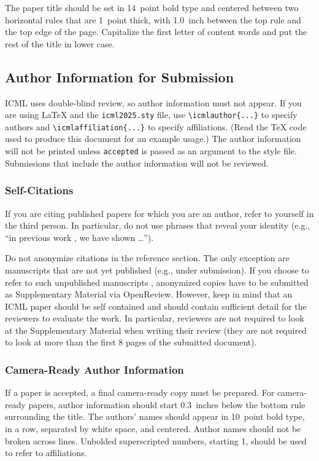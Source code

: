 \documentclass{article}
\theoremstyle{plain}
\theoremstyle{definition}
\theoremstyle{remark}
\begin{document}
The paper title should be set in 14~point bold type and centered
between two horizontal rules that are 1~point thick, with 1.0~inch
between the top rule and the top edge of the page. Capitalize the
first letter of content words and put the rest of the title in lower
case.

\subsection{Author Information for Submission}
\label{author info}

ICML uses double-blind review, so author information must not appear. If
you are using \LaTeX\/ and the \texttt{icml2025.sty} file, use
\verb+\icmlauthor{...}+ to specify authors and \verb+\icmlaffiliation{...}+ to specify affiliations. (Read the TeX code used to produce this document for an example usage.) The author information
will not be printed unless \texttt{accepted} is passed as an argument to the
style file.
Submissions that include the author information will not
be reviewed.

\subsubsection{Self-Citations}

If you are citing published papers for which you are an author, refer
to yourself in the third person. In particular, do not use phrases
that reveal your identity (e.g., ``in previous work \cite{langley00}, we
have shown \ldots'').

Do not anonymize citations in the reference section. The only exception are manuscripts that are
not yet published (e.g., under submission). If you choose to refer to
such unpublished manuscripts \cite{anonymous}, anonymized copies have
to be submitted
as Supplementary Material via OpenReview\@. However, keep in mind that an ICML
paper should be self contained and should contain sufficient detail
for the reviewers to evaluate the work. In particular, reviewers are
not required to look at the Supplementary Material when writing their
review (they are not required to look at more than the first $8$ pages of the submitted document).

\subsubsection{Camera-Ready Author Information}
\label{final author}

If a paper is accepted, a final camera-ready copy must be prepared.
%
For camera-ready papers, author information should start 0.3~inches below the
bottom rule surrounding the title. The authors' names should appear in 10~point
bold type, in a row, separated by white space, and centered. Author names should
not be broken across lines. Unbolded superscripted numbers, starting 1, should
be used to refer to affiliations.
\end{document}
